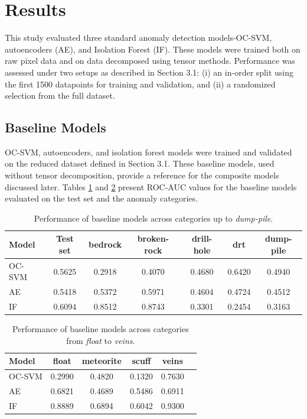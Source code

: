 \documentclass[pdflatex,sn-mathphys-ay]{sn-jnl}
\begin{document}
\section{Results}
\label{sec:results}

This study evaluated three standard anomaly detection models-OC-SVM, autoencoders (AE), and Isolation Forest (IF). These models were trained both on raw pixel data and on data decomposed using tensor methods. Performance was assessed under two setups as described in Section 3.1: (i) an in-order split using the first 1500 datapoints for training and validation, and (ii) a randomized selection from the full dataset.  

\subsection{Baseline Models}
OC-SVM, autoencoders, and isolation forest models were trained and validated on the reduced dataset defined in Section 3.1. These baseline models, used without tensor decomposition, provide a reference for the composite models discussed later. Tables \ref{tab:baseline_result_part1} and \ref{tab:baseline_result_part2} present ROC-AUC values for the baseline models evaluated on the test set and the anomaly categories.

\begin{table}
\centering
\begin{tabular}{lcccccc}
\hline
\textbf{Model} & \textbf{Test set} & \textbf{bedrock} & \textbf{broken-rock} & \textbf{drill-hole} & \textbf{drt} & \textbf{dump-pile} \\
\hline
OC-SVM & 0.5625 & 0.2918 & 0.4070 & 0.4680 & 0.6420 & 0.4940 \\
AE     & 0.5418 & 0.5372 & 0.5971 & 0.4604 & 0.4724 & 0.4512 \\
IF     & 0.6094 & 0.8512 & 0.8743 & 0.3301 & 0.2454 & 0.3163 \\
\hline
\end{tabular}
\caption{Performance of baseline models across categories up to \textit{dump-pile}.}
\label{tab:baseline_result_part1}
\end{table}

\begin{table}
\centering
\begin{tabular}{lccccc}
\hline
\textbf{Model} & \textbf{float} & \textbf{meteorite} & \textbf{scuff} & \textbf{veins} \\
\hline
OC-SVM & 0.2990 & 0.4820 & 0.1320 & 0.7630 \\
AE     & 0.6821 & 0.4689 & 0.5486 & 0.6911 \\
IF     & 0.8889 & 0.6894 & 0.6042 & 0.9300 \\
\hline
\end{tabular}
\caption{Performance of baseline models across categories from \textit{float} to \textit{veins}.}
\label{tab:baseline_result_part2}
\end{table}
\end{document}
